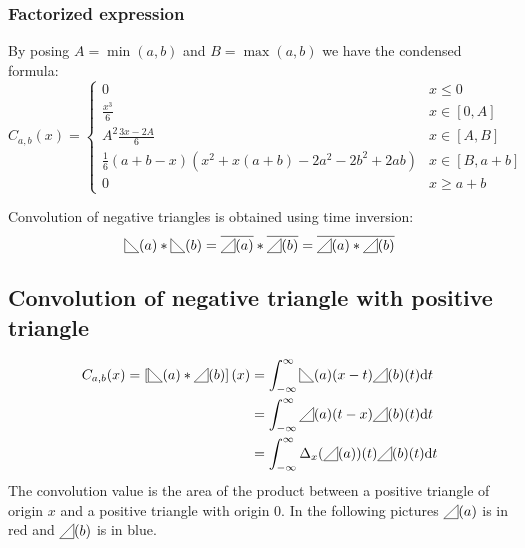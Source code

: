 \documentclass[a4paper,10pt]{article}
\newcommand\Shifted[2]{\Delta_{#1}(#2)}
\newcommand\Reversed[1]{\overline{#1}} %
\newcommand\SymPositiveTriangle{\begin{tikzpicture}[baseline=0.5ex]%
        \draw (0,0) -- (1em,0em) -- (1em,1em) -- cycle;
\end{tikzpicture}}
\newcommand\PositiveTriangle[1]{\SymPositiveTriangle(#1)}
\newcommand\SymNegativeTriangle{\begin{tikzpicture}[baseline=0.5ex]%
        \draw (0,0) -- (0,1em) -- (1em,0em) -- cycle;
\end{tikzpicture}}
\newcommand\NegativeTriangle[1]{\SymNegativeTriangle(#1)}
\newcommand\D{\mathrm{d}}
\newcommand\Convolution{\ast}
\newcommand\IntR[2]{\int_{-\infty}^{\infty}#1 \D#2}
\begin{document}
\subsubsection{Factorized expression}
By posing $A=\min(a,b)$ and $B=\max(a,b)$ we have the condensed formula:
\[ C_{a,b}(x) = \begin{cases}
    0 & x \le 0 \\
    \frac{x^3}{6} & x \in [0, A] \\
    A^2 \frac{3x-2A}{6} & x \in [A, B] \\
    \frac{1}{6} (a+b-x) (x^2 + x(a+b) -2a^2-2b^2+2ab) & x \in [B, a+b] \\
    0 & x \ge a+b
\end{cases} \]

Convolution of negative triangles is obtained using time inversion:
\[
    \NegativeTriangle{a} \Convolution \NegativeTriangle{b} =
    \Reversed{\PositiveTriangle{a}} \Convolution \Reversed{\PositiveTriangle{b}} =
    \Reversed{\PositiveTriangle{a} \Convolution \PositiveTriangle{b}}
\]

\subsection{Convolution of negative triangle with positive triangle}
\[ \begin{split}
    C_{a,b}(x) = \left[ \NegativeTriangle{a} \Convolution \PositiveTriangle{b} \right] (x) & = \IntR{\NegativeTriangle{a}(x-t) \PositiveTriangle{b}(t)}{t} \\
    & = \IntR{\PositiveTriangle{a}(t-x) \PositiveTriangle{b}(t)}{t} \\
    & = \IntR{\Shifted{x}{\PositiveTriangle{a}}(t) \PositiveTriangle{b}(t)}{t}
\end{split} \]
The convolution value is the area of the product between a positive triangle of origin $x$ and a positive triangle with origin $0$.
In the following pictures $\PositiveTriangle{a}$ is in red and $\PositiveTriangle{b}$ is in blue.
\end{document}
